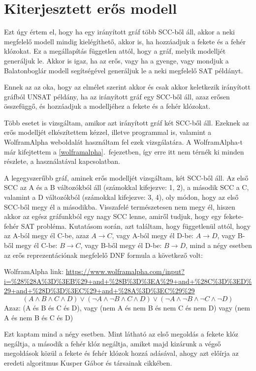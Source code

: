 \documentclass[
]{thesis-ekf}
\theoremstyle{definition}
\theoremstyle{remark}
\begin{document}
	\section{Kiterjesztett erős modell}\label{esm}
	Ezt úgy értem el, hogy ha egy irányított gráf több SCC-ből áll, akkor a neki megfelelő modell mindig kielégíthető, akkor is, ha hozzáadjuk a fekete és a fehér klózokat. Ez a megállapítás független attól, hogy a gráf, melyik modelljét generáljuk le. Akkor is igaz, ha az erős, vagy ha a gyenge, vagy mondjuk a Balatonboglár modell segítségével generáljuk le a neki megfelelő SAT példányt.
	
	Ennek az az oka, hogy az elmélet szerint akkor és csak akkor keletkezik irányított gráfból UNSAT példány, ha az irányított gráf egy SCC-ből áll, azaz erősen összefüggő, és hozzáadjuk a modelljéhez a fekete és a fehér klózokat.
	
	Több esetet is vizsgáltam, amikor azt irányított gráf két SCC-ből áll. Ezeknek az erős modelljét elkészítettem kézzel, illetve programmal is, valamint a WolframAlpha weboldalát használtam fel ezek vizsgálatára.
	A WolframAlpha-t már kifejtettem a \ref{wolframalpha}.~fejezetben, így erre itt nem térnék ki minden részlete, a használatával kapcsolatban.
	
	A legegyszerűbb gráf, aminek erős modelljét vizsgáltam, két SCC-ből áll. Az első SCC az A és a B változókból áll (számokkal kifejezve: 1, 2), a második SCC a C, valamint a D változókból (számokkal kifejezve: 3, 4), oly módon, hogy az első SCC-ből megy él a másodikba. Visszafelé természetesen nem megy él, hiszen akkor az egész gráfunkból egy nagy SCC lenne, amiről tudjuk, hogy egy fekete-fehér SAT probléma. Kutatásom során, azt találtam, hogy függetlenül attól, hogy az A-ból megy él C-be, azaz $ A \rightarrow C $, vagy A-ból megy él D-be: $A \rightarrow D$, vagy B-ből megy él C-be: $B\rightarrow C$, vagy B-ből megy él D-be: $B\rightarrow D$, mind a négy esetben az erős reprezentációnak megfelelő DNF formula a következő volt:
	
	WolframAlpha link: \url{https://www.wolframalpha.com/input?i=%28%28A%3D%3EB%29+and+%28B%3D%3EA%29+and+%28C%3D%3ED%29+and+%28D%3D%3EC%29+and+%28A%3D%3EC%29%29}
	\[ (A\wedge B\wedge C\wedge D)\vee (\neg A\wedge\neg B\wedge C\wedge D)\vee (\neg A\wedge\neg B\wedge\neg C\wedge\neg D) \]
	Azaz: (A és B és C és D), vagy (nem A és nem B és nem C és nem D) vagy (nem A és nem B és C és D)
	
	Ezt kaptam mind a négy esetben. Mint látható az első megoldás a fekete klóz negáltja, a második a fehér klóz negáltja, amiket majd kizárunk a végső megoldások közül a fekete és fehér klózok hozzá adásával, ahogy azt előírja az eredeti algoritmus Kusper Gábor és társainak cikkében.
	
\end{document}
